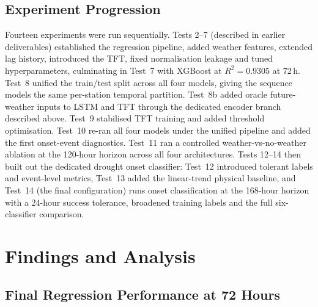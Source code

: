 \documentclass[12pt, a4paper]{article}
\begin{document}
\subsection{Experiment Progression}

Fourteen experiments were run sequentially. Tests 2--7 (described in earlier
deliverables) established the regression pipeline, added weather features,
extended lag history, introduced the TFT, fixed normalisation leakage and
tuned hyperparameters, culminating in Test~7 with XGBoost at $R^2 = 0.9305$
at 72\,h. Test~8 unified the train/test split across all four models, giving
the sequence models the same per-station temporal partition. Test~8b added
oracle future-weather inputs to LSTM and TFT through the dedicated encoder
branch described above. Test~9 stabilised TFT training and added threshold
optimisation. Test~10 re-ran all four models under the unified pipeline and
added the first onset-event diagnostics. Test~11 ran a controlled
weather-vs-no-weather ablation at the 120-hour horizon across all four
architectures. Tests 12--14 then built out the dedicated drought onset
classifier: Test~12 introduced tolerant labels and event-level metrics, Test~13
added the linear-trend physical baseline, and Test~14 (the final configuration)
runs onset classification at the 168-hour horizon with a 24-hour success
tolerance, broadened training labels and the full six-classifier comparison.

\section{Findings and Analysis}

\subsection{Final Regression Performance at 72 Hours}
\end{document}
